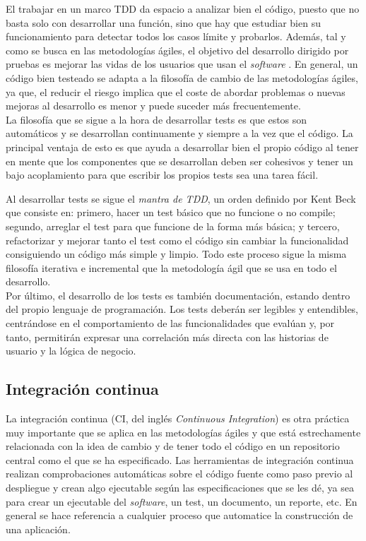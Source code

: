 El trabajar en un marco TDD da espacio a analizar bien el código, puesto que no basta solo con desarrollar una función, sino que hay que estudiar bien su funcionamiento para detectar todos los casos límite y probarlos. Además, tal y como se busca en las metodologías ágiles, el objetivo del desarrollo dirigido por pruebas es mejorar las vidas de los usuarios que usan el \textit{software} \cite{beck2002driven}. En general, un código bien testeado se adapta a la filosofía de cambio de las metodologías ágiles, ya que, el reducir el riesgo implica que el coste de abordar problemas o nuevas mejoras al desarrollo es menor y puede suceder más frecuentemente.\\

La filosofía que se sigue a la hora de desarrollar tests es que estos son automáticos y se desarrollan continuamente y siempre a la vez que el código. La principal ventaja de esto es que ayuda a desarrollar bien el propio código al tener en mente que los componentes que se desarrollan deben ser cohesivos y tener un bajo acoplamiento para que escribir los propios tests sea una tarea fácil.

Al desarrollar tests se sigue el \textit{mantra de TDD}, un orden definido por Kent Beck \cite{beck2002driven} que consiste en: primero, hacer un test básico que no funcione o no compile; segundo, arreglar el test para que funcione de la forma más básica; y tercero, refactorizar y mejorar tanto el test como el código sin cambiar la funcionalidad consiguiendo un código más simple y limpio. Todo este proceso sigue la misma filosofía iterativa e incremental que la metodología ágil que se usa en todo el desarrollo.\\

Por último, el desarrollo de los tests es también documentación, estando dentro del propio lenguaje de programación. Los tests deberán ser legibles y entendibles, centrándose en el comportamiento de las funcionalidades que evalúan y, por tanto, permitirán expresar una correlación más directa con las historias de usuario y la lógica de negocio.

\subsection{Integración continua}
La integración continua (CI, del inglés \textit{Continuous Integration}) es otra práctica muy importante que se aplica en las metodologías ágiles y que está estrechamente relacionada con la idea de cambio y de tener todo el código en un repositorio central como el que se ha especificado. Las herramientas de integración continua realizan comprobaciones automáticas sobre el código fuente como paso previo al despliegue y crean algo ejecutable según las especificaciones que se les dé, ya sea para crear un ejecutable del \textit{software}, un test, un documento, un reporte, etc. En general se hace referencia a cualquier proceso que automatice la construcción de una aplicación.\\

